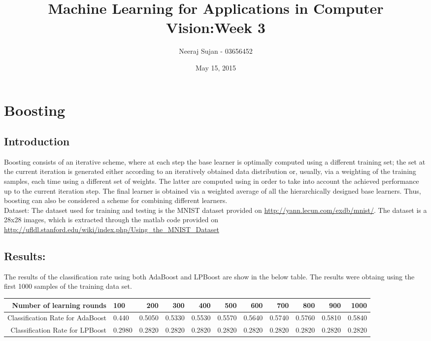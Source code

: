 \documentclass[12pt]{article}
\title{Machine Learning for Applications in Computer Vision:Week 3}
\author{Neeraj Sujan - 03656452}
\date{ May 15, 2015}
\begin{document}
\maketitle

\newpage

\section{Boosting}

\subsection{Introduction}

Boosting consists of an iterative scheme, where at each step the base learner is optimally computed using a different training set; the set at the current iteration is generated either according to an iteratively obtained data distribution or, usually, via a weighting of the training samples, each time using a different set of weights. The latter are computed using in order to take into account the achieved performance up to the current iteration step. The final learner is obtained via a weighted average of all the hierarchically designed base learners. Thus, boosting can also be considered a scheme for combining different learners.  \\

Dataset: The dataset used for training and testing is the MNIST dataset provided on \url{http://yann.lecun.com/exdb/mnist/}. The dataset is a 28x28 images, which is extracted through the matlab code provided on  \url{http://ufldl.stanford.edu/wiki/index.php/Using_the_MNIST_Dataset} 



\subsection{Results:}

The results of the classification rate using both AdaBoost and LPBoost are show in the below table. The results were obtaing using the first 1000 samples of the training data set. 

\begin{table}[ht]
\centering
\begin{adjustbox}{width=1.2\textwidth}
\small
\begin{tabular}{rlrrrrrrrrr}
\hline 
Number of learning rounds & 100 & 200 & 300 & 400 & 500 & 600 & 700 & 800 & 900 & 1000 \\ 
\hline 
Classification Rate for AdaBoost & 0.440 & 0.5050 & 0.5330 & 0.5530 & 0.5570 & 0.5640 & 0.5740 & 0.5760 & 0.5810 & 0.5840 \\ 
\hline 
Classification Rate for LPBoost & 0.2980 & 0.2820 & 0.2820 & 0.2820 & 0.2820 & 0.2820 & 0.2820 & 0.2820 & 0.2820 & 0.2820 \\ 
\hline 
\end{tabular} 
\end{adjustbox}
\end{table}
\end{document}
